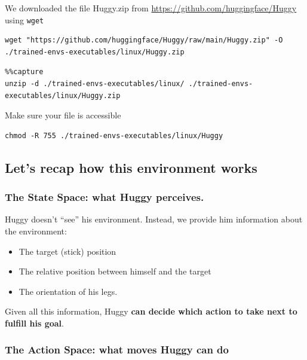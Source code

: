 \documentclass[11pt,a4paper]{article}
\begin{document}
We downloaded the file Huggy.zip from \url{https://github.com/huggingface/Huggy} using \texttt{wget}

\begin{lstlisting}
wget "https://github.com/huggingface/Huggy/raw/main/Huggy.zip" -O ./trained-envs-executables/linux/Huggy.zip
\end{lstlisting}

\begin{lstlisting}
%%capture
unzip -d ./trained-envs-executables/linux/ ./trained-envs-executables/linux/Huggy.zip
\end{lstlisting}

Make sure your file is accessible

\begin{lstlisting}
chmod -R 755 ./trained-envs-executables/linux/Huggy
\end{lstlisting}

\subsection{Let's recap how this environment works}\label{lets-recap-how-this-environment-works}

\subsubsection{The State Space: what Huggy perceives.}\label{the-state-space-what-huggy-perceives.-1}

Huggy doesn't ``see'' his environment. Instead, we provide him information about the environment:

\begin{itemize}
\tightlist
\item
  The target (stick) position
\item
  The relative position between himself and the target
\item
  The orientation of his legs.
\end{itemize}

Given all this information, Huggy \textbf{can decide which action to take next to fulfill his goal}.


\subsubsection{The Action Space: what moves Huggy can do}\label{the-action-space-what-moves-huggy-can-do}
\end{document}
